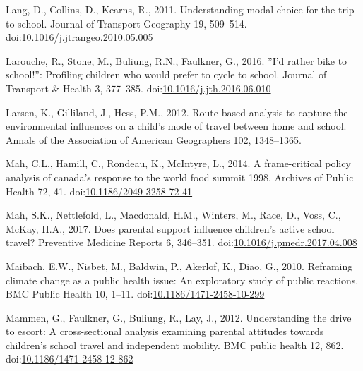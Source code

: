 \documentclass[]{elsarticle} %
\newlength{\cslhangindent}
\newlength{\cslentryspacingunit} %
\newenvironment{CSLReferences}[2] %
 {%
  \setlength{\parindent}{0pt}
  \ifodd #1
  \let\oldpar\par
  \def\par{\hangindent=\cslhangindent\oldpar}
  \fi
  \setlength{\parskip}{#2\cslentryspacingunit}
 }%
 {}
\begin{document}
\begin{CSLReferences}{1}{0}
\leavevmode{}%
Lang, D., Collins, D., Kearns, R., 2011. Understanding modal choice for
the trip to school. Journal of Transport Geography 19, 509--514.
doi:\href{https://doi.org/10.1016/j.jtrangeo.2010.05.005}{10.1016/j.jtrangeo.2010.05.005}

\leavevmode{}%
Larouche, R., Stone, M., Buliung, R.N., Faulkner, G., 2016. ''I'd rather
bike to school!'': Profiling children who would prefer to cycle to
school. Journal of Transport \& Health 3, 377--385.
doi:\href{https://doi.org/10.1016/j.jth.2016.06.010}{10.1016/j.jth.2016.06.010}

\leavevmode{}%
Larsen, K., Gilliland, J., Hess, P.M., 2012. Route-based analysis to
capture the environmental influences on a child's mode of travel between
home and school. Annals of the Association of American Geographers 102,
1348--1365.

\leavevmode{}%
Mah, C.L., Hamill, C., Rondeau, K., McIntyre, L., 2014. A frame-critical
policy analysis of canada's response to the world food summit
1998. Archives of Public Health 72, 41.
doi:\href{https://doi.org/10.1186/2049-3258-72-41}{10.1186/2049-3258-72-41}

\leavevmode{}%
Mah, S.K., Nettlefold, L., Macdonald, H.M., Winters, M., Race, D., Voss,
C., McKay, H.A., 2017. Does parental support influence children's active
school travel? Preventive Medicine Reports 6, 346--351.
doi:\href{https://doi.org/10.1016/j.pmedr.2017.04.008}{10.1016/j.pmedr.2017.04.008}

\leavevmode{}%
Maibach, E.W., Nisbet, M., Baldwin, P., Akerlof, K., Diao, G., 2010.
Reframing climate change as a public health issue: An exploratory study
of public reactions. BMC Public Health 10, 1--11.
doi:\href{https://doi.org/10.1186/1471-2458-10-299}{10.1186/1471-2458-10-299}

\leavevmode{}%
Mammen, G., Faulkner, G., Buliung, R., Lay, J., 2012. Understanding the
drive to escort: A cross-sectional analysis examining parental attitudes
towards children's school travel and independent mobility. BMC public
health 12, 862.
doi:\href{https://doi.org/10.1186/1471-2458-12-862}{10.1186/1471-2458-12-862}


\end{CSLReferences}
\end{document}
